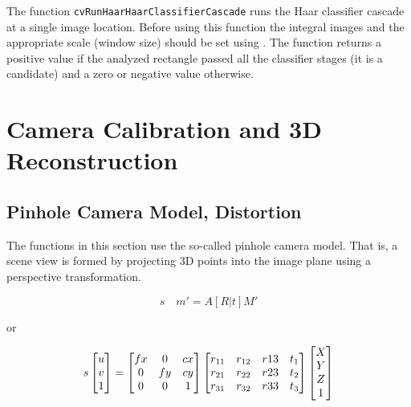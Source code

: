 
\begin{description}
\end{description}

The function \texttt{cvRunHaarHaarClassifierCascade} runs the Haar classifier
cascade at a single image location. Before using this function the
integral images and the appropriate scale (window size) should be set
using . The function returns
a positive value if the analyzed rectangle passed all the classifier stages
(it is a candidate) and a zero or negative value otherwise.

\section{Camera Calibration and 3D Reconstruction}

\subsection{Pinhole Camera Model, Distortion}

The functions in this section use the so-called pinhole camera model. That
is, a scene view is formed by projecting 3D points into the image plane
using a perspective transformation.

\[
s \quad m' = A [R|t] M'
\]

or

\[
s \begin{bmatrix} u\\ v\\ 1 \end{bmatrix} = \begin{bmatrix} fx & 0 & cx\\ 0 & fy & cy\\ 0 & 0 & 1 \end{bmatrix}
\begin{bmatrix}
 r_{11} & r_{12} & r{13} & t_1 \\
 r_{21} & r_{22} & r{23} & t_2 \\
 r_{31} & r_{32} & r{33} & t_3
\end{bmatrix}
\begin{bmatrix}X\\Y\\Z\\1 \end{bmatrix}
\]

